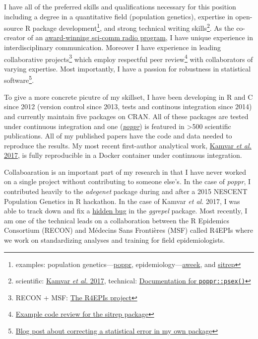 I have all of the preferred skills and qualifications necessary for this
position including a degree in a quantitative field (population genetics),
expertise in open-source R package development\footnote{examples: population
genetics---\href{https://grunwaldlab.github.io/poppr}{poppr},
epidemiology---\href{https://www.repidemicsconsortium.org/aweek}{aweek}, and
\href{https://github.com/R4EPI/sitrep}{sitrep}}, and strong technical writing
skills\footnote{scientific: \href{https://peerj.com/articles/4152/}{Kamvar
\textit{et al.} 2017}, technical:
\href{https://grunwaldlab.github.io/poppr/reference/psex.html}{Documentation
for \texttt{poppr::psex()}}}.
As the co-creator of an
\href{https://blogs.oregonstate.edu/inspiration}{award-winning sci-comm radio
program}, I have unique experience in interdisciplinary communication.  
Moreover I have experience in leading collaborative projects\footnote{RECON + MSF:
\href{https://R4EPIs.netlify.com}{The R4EPIs project}} which employ respectful
peer review\footnote{\href{https://github.com/R4EPI/sitrep/pull/76}{Example
code review for the sitrep package}} with collaborators of varying expertise.
Most importantly, I have a passion for robustness in statistical
software\footnote{\href{https://zkamvar.netlify.com/post/2017-09-23-squish/squish}{Blog
post about correcting a statistical error in my own package}}.

\vspace{1ex}


To give a more concrete picutre of my skillset, I have been developing in R and
C since 2012 (version control since 2013, tests and continous integration since 
2014) and currently maintain five packages on CRAN. All of these packages are
tested under continuous integration and one
(\href{https://grunwaldlab.github.io/poppr}{\textit{poppr}}) is featured in
\textgreater500 scientific publications. All of my published papers have the
code and data needed to reproduce the results. My most recent first-author 
analytical work, \href{https://peerj.com/articles/4152/}{Kamvar \textit{et al.}
2017}, is fully reproducible in a Docker container under continuous integration. 

\vspace{1ex}

Collaboaration is an important part of my research in that I have never worked
on a single project without contributing to someone else's. In the case of
\textit{poppr}, I contributed heavily to the \textit{adegenet} package during
and after a 2015 NESCENT Population Genetics in R hackathon. In the case of
Kamvar \textit{et al.} 2017, I was able to track down and fix a
\href{https://github.com/slowkow/ggrepel/issues/72}{hidden bug} in the
\textit{ggrepel} package. Most recently, I am one of the technical leads on a
collaboration between the R Epidemics Consortium (RECON) and M\'{e}decins Sans
Fronti\`{e}res (MSF) called R4EPIs where we work on standardizing analyses and
training for field epidemiologists.  

